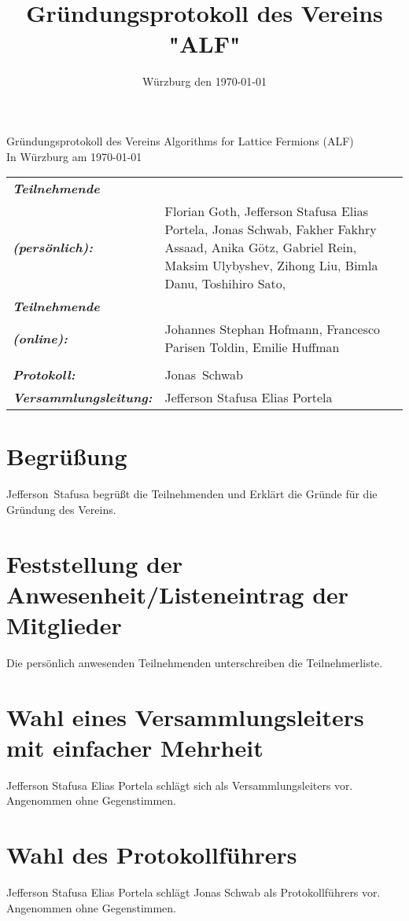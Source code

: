 \documentclass[a4paper,german,12pt]{scrartcl}
\title{Gründungsprotokoll des Vereins "ALF"}
\author{}
\date{Würzburg den \today}
\begin{document}
\renewcommand{\contentsname}{Tagesordnungspunkte}
\begin{center}
{\huge Gründungsprotokoll des Vereins \glqq Algorithms for Lattice Fermions (ALF)\grqq\\ In Würzburg am \today}\bigskip %

\begin{tabular}{>{\bfseries \itshape}m{}p{}}
Teilnehmende \\ (persönlich):  & 
Florian Goth,
Jefferson Stafusa Elias Portela,
Jonas Schwab,
Fakher Fakhry Assaad,
Anika Götz,
Gabriel Rein,
Maksim Ulybyshev,
Zihong Liu,
Bimla Danu,
Toshihiro Sato,
\\ 
Teilnehmende \\ (online):  &
Johannes Stephan Hofmann,
Francesco Parisen Toldin,
Emilie Huffman
\\ \\
Protokoll: & Jonas~Schwab
\\
Versammlungsleitung: & Jefferson Stafusa Elias Portela

\end{tabular}
\end{center}
\tableofcontents \newpage

\section{Begrüßung}
Jefferson~Stafusa begrüßt die Teilnehmenden und Erklärt die Gründe für die Gründung des Vereins.

\section{Feststellung der Anwesenheit/Listeneintrag der Mitglieder}
Die persönlich anwesenden Teilnehmenden unterschreiben die Teilnehmerliste. 

\section{Wahl eines Versammlungsleiters mit einfacher Mehrheit}
Jefferson Stafusa Elias Portela schlägt sich als Versammlungsleiters vor. Angenommen ohne Gegenstimmen.

\section{Wahl des Protokollführers}
Jefferson Stafusa Elias Portela schlägt Jonas Schwab als Protokollführers vor. Angenommen ohne Gegenstimmen.
\end{document}
